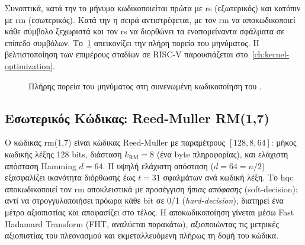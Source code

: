 Συνοπτικά, κατά την \Encaps το μήνυμα κωδικοποιείται πρώτα με \gls{rs}
(εξωτερικός) και κατόπιν με \gls{rm} (εσωτερικός). Κατά την \Decaps η σειρά
αντιστρέφεται, με τον \gls{rm} να αποκωδικοποιεί κάθε σύμβολο ξεχωριστά και τον
\gls{rs} να διορθώνει τα εναπομείναντα σφάλματα σε επίπεδο συμβόλων.
Το~\cref{fig:concatenated-pipeline} απεικονίζει την πλήρη πορεία του μηνύματος. 
Η βελτιστοποίηση των επιμέρους σταδίων σε RISC-V
παρουσιάζεται στο~\cref{ch:kernel-optimization}.

\begin{figure}[htbp]
  \centering
  \resizebox{\linewidth}{!}{}
  \caption{Πλήρης πορεία του μηνύματος στη συνενωμένη κωδικοποίηση του \HQC.}
  \label{fig:concatenated-pipeline}
\end{figure}


\subsection{Εσωτερικός Κώδικας: Reed-Muller RM(1,7)}
\label{sec:reed-muller-theory}

Ο κώδικας \gls{rm}(1,7) είναι κώδικας Reed-Muller με παραμέτρους
$[128, 8, 64]$:
μήκος κωδικής λέξης 128 bits, διάσταση $k_{\mathrm{RM}} = 8$ (ένα byte πληροφορίας), και
ελάχιστη απόσταση Hamming $d = 64$.
Η υψηλή ελάχιστη απόσταση ($d = 64 = n/2$) εξασφαλίζει ικανότητα διόρθωσης έως
$t = 31$ σφαλμάτων ανά κωδική λέξη. Το \gls{hqc}
αποκωδικοποιεί τον \gls{rm} αποκλειστικά με προσέγγιση \emph{ήπιας απόφασης}
(soft-decision): αντί να στρογγυλοποιήσει πρόωρα κάθε bit σε 0/1
(\emph{hard-decision}), διατηρεί ένα μέτρο αξιοπιστίας και αποφασίζει στο τέλος.
Η αποκωδικοποίηση γίνεται μέσω Fast Hadamard Transform (FHT, αναλύεται
παρακάτω), αξιοποιώντας τις μετρικές αξιοπιστίας του πλεονασμού και
εκμεταλλευόμενη πλήρως τη δομή του κώδικα.

